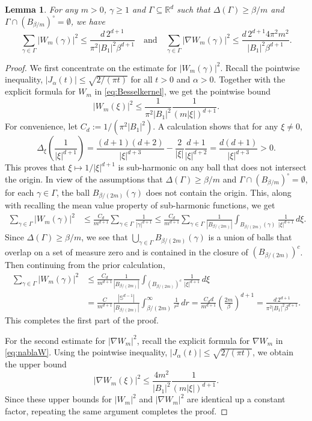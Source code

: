 \documentclass[11pt]{article}
\newtheorem{lemma}[theorem]{Lemma}
\theoremstyle{definition}
\numberwithin{theorem}{section}
\numberwithin{lemma}{section}
\numberwithin{equation}{section}
\def\R{\mathbb{R}}
\def\S{\mathbb{S}}
\renewcommand{\subset}{\subseteq}
\def\andspace{\quad\text{and}\quad}
\numberwithin{equation}{section}
\begin{document}
	\begin{lemma} \label{lem:besselenergy2}
		For any $m>0$, $\gamma\geq 1$ and $\Gamma\subset\R^d$ such that $\Delta(\Gamma)\geq \beta/m$ and $\Gamma\cap (B_{\beta/m})^\circ = \emptyset$, we have
		$$
		\sum_{\gamma\in \Gamma} |W_m(\gamma)|^2
		\leq \frac{d\, 2^{d+1}}{\pi^2 |B_1|^2 \beta^{d+1}} \andspace
		\sum_{\gamma\in \Gamma} |\nabla W_m(\gamma)|^2
		\leq \frac{d \, 2^{d+1} 4\pi^2 m^2 }{|B_1|^2 \beta^{d+1}}.
		$$
	\end{lemma}
	\begin{proof}		
		We first concentrate on the estimate for $|W_m(\gamma)|^2$. Recall the pointwise inequality, $|J_\alpha(t)|\leq \sqrt{2/(\pi t)}$ for all $t>0$ and $\alpha>0$. Together with the explicit formula for $W_m$ in \eqref{eq:Besselkernel}, we get the pointwise bound
		$$
		|W_m(\xi)|^2
		\leq \frac{1}{\pi^2 |B_1|^2}  \frac{1}{(m|\xi|)^{d+1}}. 
		$$
		For convenience, let $C_d:=1/(\pi^2 |B_1|^2)$. 
		A calculation shows that for any $\xi\ne0$, 
		$$
		\Delta_\xi \left(\frac{1}{|\xi|^{d+1}}\right)
		= \frac{(d+1)(d+2)}{|\xi|^{d+3}} - \frac 2 {|\xi|} \frac{d+1}{|\xi|^{d+2}} 
		= \frac{d(d+1)}{|\xi|^{d+3}}
		>0. 
		$$
		This proves that $\xi\mapsto 1/|\xi|^{d+1}$ is sub-harmonic on any ball that does not intersect the origin. In view of the assumptions that $\Delta(\Gamma)\geq \beta/m$ and $\Gamma\cap (B_{\beta/m})^\circ=\emptyset$, for each $\gamma\in \Gamma$, the ball $B_{\beta/(2m)}(\gamma)$ does not contain the origin. This, along with recalling the mean value property of sub-harmonic functions, we get
		\begin{align*}
			\sum_{\gamma\in \Gamma} |W_m(\gamma)|^2
			&\leq \frac{C_d}{m^{d+1}} \sum_{\gamma\in \Gamma} \frac 1{|\gamma|^{d+1}}
			\leq \frac{C_d}{m^{d+1}} \sum_{\gamma\in \Gamma} \frac 1{|B_{\beta/(2m)}|} \int_{B_{\beta/(2m)}(\gamma)} \frac{1}{|\xi|^{d+1}} \, d\xi.
		\end{align*}
		Since $\Delta(\Gamma)\geq \beta/m$, we see that $\bigcup_{\gamma\in \Gamma} B_{\beta/(2m)}(\gamma)$ is a union of balls that overlap on a set of measure zero and is contained in the closure of $(B_{\beta/(2m)})^c$. Then continuing from the prior calculation,
		\begin{align*}
			\sum_{\gamma\in \Gamma} |W_m(\gamma)|^2
			&\leq \frac{C_d}{m^{d+1}} \frac 1{|B_{\beta/(2m)}|} \int_{(B_{\beta/(2m)})^c} \frac{1}{|\xi|^{d+1}} \, d\xi \\
			&= \frac{C}{m^{d+1}}  \frac{|\S^{d-1}|}{|B_{\beta/(2m)}|} \int_{\beta/(2m)}^\infty \frac{1}{r^2} \, dr 
			= \frac{C_d d }{m^{d+1}} \left(\frac{2m}{\beta}\right)^{d+1} 
			= \frac{d\, 2^{d+1}}{\pi^2 |B_1|^2 \beta^{d+1}}. 
		\end{align*}
		This completes the first part of the proof. 
		
		For the second estimate for $|\nabla W_m|^2$, recall the explicit formula for $\nabla W_m$ in \eqref{eq:nablaW}. Using the pointwise inequality, $|J_\alpha(t)|\leq \sqrt{2/(\pi t)}$, we obtain the upper bound
		$$
		|\nabla W_m(\xi)|^2
		\leq \frac{4m^2}{|B_1|^2} \frac{1}{(m|\xi|)^{d+1}}. 
		$$
		Since these upper bounds for $|W_m|^2$ and $|\nabla W_m|^2$ are identical up a constant factor, repeating the same argument completes the proof.	
	\end{proof}
	
\end{document}
